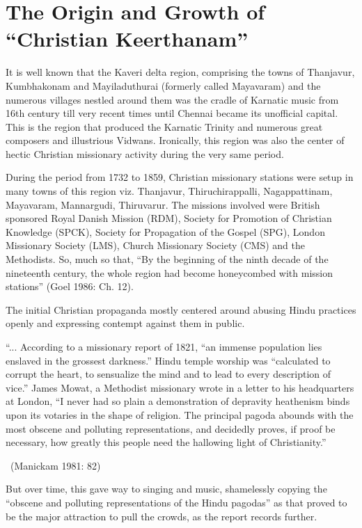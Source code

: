 \section*{The Origin and Growth of “Christian Keerthanam”}

It is well known that the Kaveri delta region, comprising the towns of Thanjavur, Kumbhakonam and Mayiladuthurai (formerly called Mayavaram) and the numerous villages nestled around them was the cradle of Karnatic music from 16th century till very recent times until Chennai became its unofficial capital. This is the region that produced the Karnatic Trinity and numerous great composers and illustrious Vidwans. Ironically, this region was also the center of hectic Christian missionary activity during the very same period.

During the period from 1732 to 1859, Christian missionary stations were setup in many towns of this region viz. Thanjavur, Thiruchirappalli, Nagappattinam, Mayavaram, Mannargudi, Thiruvarur. The missions involved were British sponsored Royal Danish Mission (RDM), Society for Promotion of Christian Knowledge (SPCK), Society for Propagation of the Gospel (SPG), London Missionary Society (LMS), Church Missionary Society (CMS) and the Methodists. So, much so that, “By the beginning of the ninth decade of the nineteenth century, the whole region had become honeycombed with mission stations” (Goel 1986: Ch. 12).

The initial Christian propaganda mostly centered around abusing Hindu practices openly and expressing contempt against them in public.

\begin{myquote}
“... According to a missionary report of 1821, “an immense population lies enslaved in the grossest darkness.” Hindu temple worship was “calculated to corrupt the heart, to sensualize the mind and to lead to every description of vice.” James Mowat, a Methodist missionary wrote in a letter to his headquarters at London, “I never had so plain a demonstration of depravity heathenism binds upon its votaries in the shape of religion. The principal pagoda abounds with the most obscene and polluting representations, and decidedly proves, if proof be necessary, how greatly this people need the hallowing light of Christianity.” 

~\hfill (Manickam 1981: 82)
\end{myquote}

But over time, this gave way to singing and music, shamelessly copying the “obscene and polluting representations of the Hindu pagodas” as that proved to be the major attraction to pull the crowds, as the report records further.

